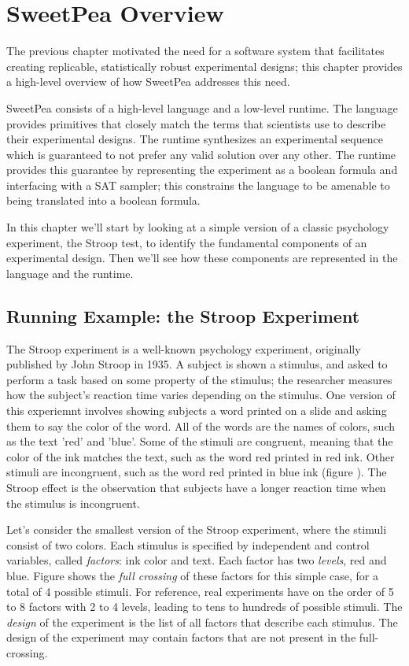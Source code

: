 
\chapter{SweetPea Overview}

The previous chapter motivated the need for a software system that facilitates creating replicable, statistically robust experimental designs; this chapter provides a high-level overview of how SweetPea addresses this need.

SweetPea consists of a high-level language and a low-level runtime. The language provides primitives that closely match the terms that scientists use to describe their experimental designs. The runtime synthesizes an experimental sequence which is guaranteed to not prefer any valid solution over any other. The runtime provides this guarantee by representing the experiment as a boolean formula and interfacing with a SAT sampler; this constrains the language to be amenable to being translated into a boolean formula.

In this chapter we'll start by looking at a simple version of a classic psychology experiment, the Stroop test, to identify the fundamental components of an experimental design. Then we'll see how these components are represented in the language and the runtime.

\section{Running Example: the Stroop Experiment}

The Stroop experiment is a well-known psychology experiment, originally published by John Stroop in 1935. A subject is shown a stimulus, and asked to perform a task based on some property of the stimulus; the researcher measures how the subject's reaction time varies depending on the stimulus. One version of this experiemnt involves showing subjects a word printed on a slide and asking them to say the color of the word. All of the words are the names of colors, such as the text 'red' and 'blue'. Some of the stimuli are congruent, meaning that the color of the ink matches the text, such as the word red printed in red ink. Other stimuli are incongruent, such as the word red printed in blue ink (figure ). The Stroop effect is the observation that subjects have a longer reaction time when the stimulus is incongruent.

Let's consider the smallest version of the Stroop experiment, where the stimuli consist of two colors. Each stimulus is specified by independent and control variables, called \emph{factors}: ink color and text. Each factor has two \emph{levels}, red and blue. Figure  shows the \emph{full crossing} of these factors for this simple case, for a total of 4 possible stimuli. For reference, real experiments have on the order of 5 to 8 factors with 2 to 4 levels, leading to tens to hundreds of possible stimuli. The \emph{design} of the experiment is the list of all factors that describe each stimulus. The design of the experiment may contain factors that are not present in the full-crossing.

